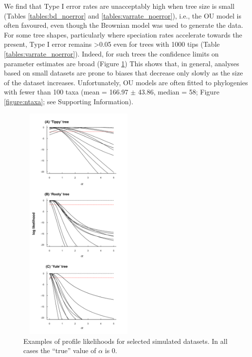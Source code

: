 \documentclass[a4paper,12pt]{article}
\begin{document}
    We find that Type I error rates are unacceptably high when tree size is small (Tables \ref{tables:bd_noerror} and \ref{tables:varrate_noerror}), i.e., the OU model is often favoured, even though the Brownian model was used to generate the data. 
    For some tree shapes, particularly where speciation rates accelerate towards the present, Type I error remains \textgreater 0.05 even for trees with 1000 tips (Table \ref{tables:varrate_noerror}). 
    Indeed, for such trees the confidence limits on parameter estimates are broad (Figure \ref{figure:ouprofiles})
    This shows that, in general, analyses based on small datasets are prone to biases that decrease only slowly as the size of the dataset increases. 
    Unfortunately, OU models are often fitted to phylogenies with fewer than 100 taxa (mean = 166.97 $\pm$ 43.86, median = 58; Figure \ref{figure:ntaxa}; see Supporting Information). 

    \begin{figure}[!htbp]
      \centering
      \includegraphics[width=6cm, height=12cm, keepaspectratio=true]{Figures/OhYou_Figure2.pdf}
      \caption{Examples of profile likelihoods for selected simulated datasets. In all cases the ``true'' value of $\alpha$ is 0.
      }
      \label{figure:ouprofiles}
\end{figure}
\end{document}
